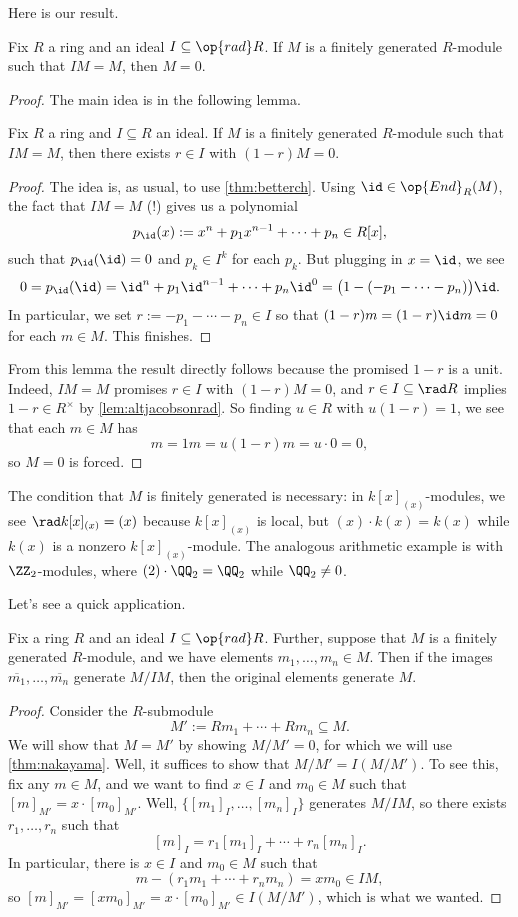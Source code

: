Here is our result.
\begin{theorem} \label{thm:nakayama}
	Fix $R$ a ring and an ideal $I\subseteq\op{rad}R$. If $M$ is a finitely generated $R$-module such that $IM=M$, then $M=0$.
\end{theorem}
\begin{proof}
	The main idea is in the following lemma.
	\begin{lemma} \label{lem:nakayamalemlem}
		Fix $R$ a ring and $I\subseteq R$ an ideal. If $M$ is a finitely generated $R$-module such that $IM=M$, then there exists $r\in I$ with $(1-r)M=0$.
	\end{lemma}
	\begin{proof}
		The idea is, as usual, to use \autoref{thm:betterch}. Using $\id\in\op{End}_R(M)$, the fact that $IM=M$ (!) gives us a polynomial
		\[p_{\id}(x):=x^n+p_1x^{n-1}+\cdots+p_n\in R[x],\]
		such that $p_{\id}({\id})=0$ and $p_k\in I^k$ for each $p_k$. But plugging in $x=\id$, we see
		\[0=p_{\id}({\id})={\id}^n+p_1{\id}^{n-1}+\cdots+p_n{\id}^0=\big(1-(-p_1-\cdots-p_n)\big){\id}.\]
		In particular, we set $r:=-p_1-\cdots-p_n\in I$ so that $(1-r)m=(1-r)\id m=0$ for each $m\in M$. This finishes.
	\end{proof}
	From this lemma the result directly follows because the promised $1-r$ is a unit. Indeed, $IM=M$ promises $r\in I$ with $(1-r)M=0$, and $r\in I\subseteq\rad R$ implies $1-r\in R^\times$ by \autoref{lem:altjacobsonrad}. So finding $u\in R$ with $u(1-r)=1$, we see that each $m\in M$ has
	\[m=1m=u(1-r)m=u\cdot 0=0,\]
	so $M=0$ is forced.
\end{proof}
\begin{remark}[Nir] \label{rem:fingennakayama}
	The condition that $M$ is finitely generated is necessary: in $k[x]_{(x)}$-modules, we see $\rad k[x]_{(x)}=(x)$ because $k[x]_{(x)}$ is local, but $(x)\cdot k(x)=k(x)$ while $k(x)$ is a nonzero $k[x]_{(x)}$-module. The analogous arithmetic example is with $\ZZ_2$-modules, where $(2)\cdot\QQ_2=\QQ_2$ while $\QQ_2\ne0$.
\end{remark}
Let's see a quick application.
\begin{corollary} \label{cor:quotientdimension}
	Fix a ring $R$ and an ideal $I\subseteq\op{rad}R$. Further, suppose that $M$ is a finitely generated $R$-module, and we have elements $m_1,\ldots,m_n\in M$. Then if the images $\overline{m_1},\ldots,\overline{m_n}$ generate $M/IM$, then the original elements generate $M$.
\end{corollary}
\begin{proof}
	Consider the $R$-submodule
	\[M':=Rm_1+\cdots+Rm_n\subseteq M.\]
	We will show that $M=M'$ by showing $M/M'=0$, for which we will use \autoref{thm:nakayama}. Well, it suffices to show that $M/M'=I(M/M')$. To see this, fix any $m\in M$, and we want to find $x\in I$ and $m_0\in M$ such that $[m]_{M'}=x\cdot[m_0]_{M'}$. Well, $\{[m_1]_I,\ldots,[m_n]_I\}$ generates $M/IM$, so there exists $r_1,\ldots,r_n$ such that
	\[[m]_I=r_1[m_1]_{I}+\cdots+r_n[m_n]_I.\]
	In particular, there is $x\in I$ and $m_0\in M$ such that
	\[m-(r_1m_1+\cdots+r_nm_n)=xm_0\in IM,\]
	so $[m]_{M'}=[xm_0]_{M'}=x\cdot[m_0]_{M'}\in I(M/M')$, which is what we wanted.
\end{proof}
